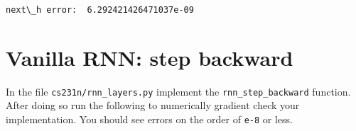 \documentclass[11pt]{article}
\begin{document}
    \begin{Verbatim}[commandchars=\\\{\}]
next\_h error:  6.292421426471037e-09

    \end{Verbatim}

    \hypertarget{vanilla-rnn-step-backward}{%
\section{Vanilla RNN: step backward}\label{vanilla-rnn-step-backward}}

In the file \texttt{cs231n/rnn\_layers.py} implement the
\texttt{rnn\_step\_backward} function. After doing so run the following
to numerically gradient check your implementation. You should see errors
on the order of \texttt{e-8} or less.
\end{document}
